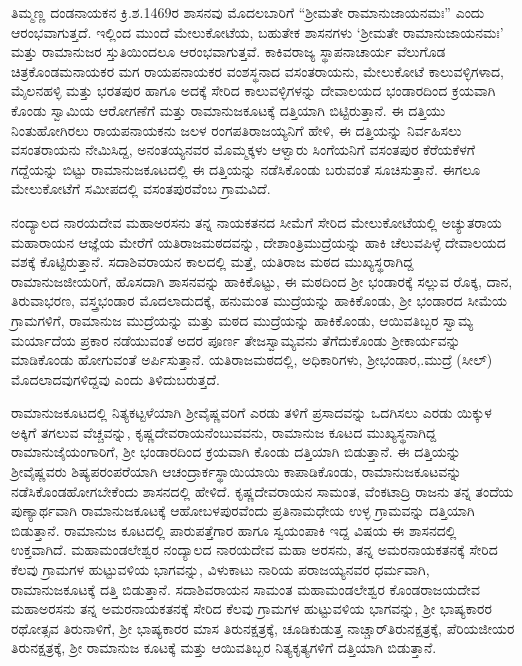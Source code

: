 ತಿಮ್ಮಣ್ಣ ದಂಡನಾಯಕನ ಕ್ರಿ.ಶ.1469ರ ಶಾಸನವು ಮೊದಲಬಾರಿಗೆ “ಶ‍್ರೀಮತೇ ರಾಮಾನುಜಾಯನಮಃ” ಎಂದು ಆರಂಭವಾಗುತ್ತದೆ. ಇಲ್ಲಿಂದ ಮುಂದೆ ಮೇಲುಕೋಟೆಯ, ಬಹುತೇಕ ಶಾಸನಗಳು ‘ಶ‍್ರೀಮತೇ ರಾಮಾನುಜಾಯನಮಃ’ ಮತ್ತು ರಾಮಾನುಜರ ಸ್ತುತಿಯಿಂದಲೂ ಆರಂಭವಾಗುತ್ತವೆ. ಕಾಕಿವರಾಜ್ಯ ಸ್ಥಾಪನಾಚಾರ್ಯ ವೆಲುಗೊಡ ಚಿತ್ರಕೊಂಡಮನಾಯಕರ ಮಗ ರಾಯಪನಾಯಕರ ವಂಶಸ್ಥನಾದ ವಸಂತರಾಯನು, ಮೇಲುಕೋಟೆ ಕಾಲುವಳ್ಳಿಗಳಾದ, ಮೈಲನಹಳ್ಳಿ ಮತ್ತು ಭರತಪುರ ಹಾಗೂ ಅದಕ್ಕೆ ಸೇರಿದ ಕಾಲುವಳ್ಳಿಗಳನ್ನು ದೇವಾಲಯದ ಭಂಡಾರದಿಂದ ಕ್ರಯವಾಗಿ ಕೊಂಡು ಸ್ವಾಮಿಯ ಆರೋಗಣೆಗೆ ಮತ್ತು ರಾಮಾನುಜಕೂಟಕ್ಕೆ ದತ್ತಿಯಾಗಿ ಬಿಟ್ಟಿರುತ್ತಾನೆ. ಈ ದತ್ತಿಯು ನಿಂತುಹೋಗಿರಲು ರಾಯಪನಾಯಕನು ಜಲಳ ರಂಗಪತಿರಾಜಯ್ಯನಿಗೆ ಹೇಳಿ, ಈ ದತ್ತಿಯನ್ನು ನಿರ್ವಹಿಸಲು ವಸಂತರಾಯನು ನೇಮಿಸಿದ್ದ, ಅನಂತಯ್ಯನವರ ಮೊಮ್ಮಕ್ಕಳು ಆಳ್ವಾರು ಸಿಂಗೆಯನಿಗೆ ವಸಂತಪುರ ಕೆರೆಯಕೆಳಗೆ ಗದ್ದೆಯನ್ನು ಬಿಟ್ಟು ರಾಮಾನುಜಕೂಟದಲ್ಲಿ ಈ ದತ್ತಿಯನ್ನು ನಡೆಸಿಕೊಂಡು ಬರುವಂತೆ ಸೂಚಿಸುತ್ತಾನೆ. ಈಗಲೂ ಮೇಲುಕೋಟೆಗೆ ಸಮೀಪದಲ್ಲಿ ವಸಂತಪುರವೆಂಬ ಗ್ರಾಮವಿದೆ.

ನಂದ್ಯಾಲದ ನಾರಯದೇವ ಮಹಾಅರಸನು ತನ್ನ ನಾಯಕತನದ ಸೀಮೆಗೆ ಸೇರಿದ ಮೇಲುಕೋಟೆಯಲ್ಲಿ ಅಚ್ಯುತರಾಯ ಮಹಾರಾಯನ ಆಜ್ಞೆಯ ಮೇರೆಗೆ ಯತಿರಾಜಮಠದವನ್ನು, ದೇಶಾಂತ್ರಿಮುದ್ರೆಯನ್ನು ಹಾಕಿ ಚೆಲುವಪಿಳ್ಳೆ ದೇವಾಲಯದ ವಶಕ್ಕೆ ಕೊಟ್ಟಿರುತ್ತಾನೆ. ಸದಾಶಿವರಾಯನ ಕಾಲದಲ್ಲಿ ಮತ್ತೆ, ಯತಿರಾಜ ಮಠದ ಮುಖ್ಯಸ್ಥರಾಗಿದ್ದ ರಾಮಾನುಜಜೀಯರಿಗೆ, ಹೊಸದಾಗಿ ಶಾಸನವನ್ನು ಹಾಕಿಕೊಟ್ಟು, ಈ ಮಠದಿಂದ ಶ‍್ರೀ ಭಂಡಾರಕ್ಕೆ ಸಲ್ಲುವ ರೊಕ್ಕ, ದಾನ, ತಿರುವಾಭರಣ, ವಸ್ತ್ರಭಂಡಾರ ಮೊದಲಾದುದಕ್ಕೆ, ಹನುಮಂತ ಮುದ್ರೆಯನ್ನು ಹಾಕಿಕೊಂಡು, ಶ‍್ರೀ ಭಂಡಾರದ ಸೀಮೆಯ ಗ್ರಾಮಗಳಿಗೆ, ರಾಮಾನುಜ ಮುದ್ರೆಯನ್ನು ಮತ್ತು ಮಠದ ಮುದ್ರೆಯನ್ನು ಹಾಕಿಕೊಂಡು, ಆಯಿವತಿಬ್ಬರ ಸ್ವಾಮ್ಯ ಮರ್ಯಾದೆಯ ಪ್ರಕಾರ ನಡೆಯುವಂತೆ ಅದರ ಪೂರ್ಣ ತೇಜಸ್ವಾಮ್ಯವನು ತೆಗೆದುಕೊಂಡು ಶ‍್ರೀಕಾರ್ಯವನ್ನು ಮಾಡಿಕೊಂಡು ಹೋಗುವಂತೆ ಅರ್ಪಿಸುತ್ತಾನೆ. ಯತಿರಾಜಮಠದಲ್ಲಿ, ಅಧಿಕಾರಿಗಳು, ಶ‍್ರೀಭಂಡಾರ,.ಮುದ್ರೆ (ಸೀಲ್​) ಮೊದಲಾದವುಗಳಿದ್ದವು ಎಂದು ತಿಳಿದುಬರುತ್ತದೆ.

ರಾಮಾನುಜಕೂಟದಲ್ಲಿ ನಿತ್ಯಕಟ್ಟಳೆಯಾಗಿ ಶ‍್ರೀವೈಷ್ಣವರಿಗೆ ಎರಡು ತಳಿಗೆ ಪ್ರಸಾದವನ್ನು ಒದಗಿಸಲು ಎರಡು ಯಿಕ್ಕುಳ ಅಕ್ಕಿಗೆ ತಗಲುವ ವೆಚ್ಚವನ್ನು, ಕೃಷ್ಣದೇವರಾಯನೆಂಬುವವನು, ರಾಮಾನುಜ ಕೂಟದ ಮುಖ್ಯಸ್ಥನಾಗಿದ್ದ ರಾಮಾನುಜೈಯಂಗಾರಿಗೆ, ಶ‍್ರೀ ಭಂಡಾರದಿಂದ ಕ್ರಯವಾಗಿ ಕೊಂಡು ದತ್ತಿಯಾಗಿ ಬಿಡುತ್ತಾನೆ. ಈ ದತ್ತಿಯನ್ನು ಶ‍್ರೀವೈಷ್ಣವರು ಶಿಷ್ಯಪರಂಪರೆಯಾಗಿ ಆಚಂದ್ರಾರ್ಕಸ್ಥಾಯಿಯಾಯಿ ಕಾಪಾಡಿಕೊಂಡು, ರಾಮಾನುಜಕೂಟವನ್ನು ನಡೆಸಿಕೊಂಡಹೋಗಬೇಕೆಂದು ಶಾಸನದಲ್ಲಿ ಹೇಳಿದೆ. ಕೃಷ್ಣದೇವರಾಯನ ಸಾಮಂತ, ವೆಂಕಟಾದ್ರಿ ರಾಜನು ತನ್ನ ತಂದೆಯ ಪುಣ್ಯಾರ್ಥವಾಗಿ ರಾಮಾನುಜಕೂಟಕ್ಕೆ ಆಹೋಬಳಪುರವೆಂದು ಪ್ರತಿನಾಮಧೇಯ ಉಳ್ಳ ಗ್ರಾಮವನ್ನು ದತ್ತಿಯಾಗಿ ಬಿಡುತ್ತಾನೆ. ರಾಮಾನುಜ ಕೂಟದಲ್ಲಿ ಪಾರುಪತ್ತೆಗಾರ ಹಾಗೂ ಸ್ವಯಂಪಾಕಿ ಇದ್ದ ವಿಷಯ ಈ ಶಾಸನದಲ್ಲಿ ಉಕ್ತವಾಗಿದೆ. ಮಹಾಮಂಡಲೇಶ್ವರ ನಂದ್ಯಾಲದ ನಾರಯದೇವ ಮಹಾ ಅರಸನು, ತನ್ನ ಅಮರನಾಯಕತನಕ್ಕೆ ಸೇರಿದ ಕೆಲವು ಗ್ರಾಮಗಳ ಹುಟ್ಟುವಳಿಯ ಭಾಗವನ್ನು, ವಿಳುಕಾಟು ನಾರಿಯ ಪರಾಜಯ್ಯನವರ ಧರ್ಮವಾಗಿ, ರಾಮಾನುಜಕೂಟಕ್ಕೆ ದತ್ತಿ ಬಿಡುತ್ತಾನೆ. ಸದಾಶಿವರಾಯನ ಸಾಮಂತ ಮಹಾಮಂಡಲೇಶ್ವರ ಕೊಂಡರಾಜಯದೇವ ಮಹಾಅರಸನು ತನ್ನ ಅಮರನಾಯಕತನಕ್ಕೆ ಸೇರಿದ ಕೆಲವು ಗ್ರಾಮಗಳ ಹುಟ್ಟುವಳಿಯ ಭಾಗವನ್ನು, ಶ‍್ರೀ ಭಾಷ್ಯಕಾರರ ರಥೋತ್ಸವ ತಿರುನಾಳಿಗೆ, ಶ‍್ರೀ ಭಾಷ್ಯಕಾರರ ಮಾಸ ತಿರುನಕ್ಷತ್ರಕ್ಕೆ, ಚೂಡಿಕುಡುತ್ತ ನಾಚ್ಚಾರ್​ ತಿರುನಕ್ಷತ್ರಕ್ಕೆ, ಪೆರಿಯಜೀಯರ ತಿರುನಕ್ಷತ್ರಕ್ಕೆ, ಶ‍್ರೀ ರಾಮಾನುಜ ಕೂಟಕ್ಕೆ ಮತ್ತು ಆಯಿವತಿಬ್ಬರ ನಿತ್ಯಕೃತ್ಯಗಳಿಗೆ ದತ್ತಿಯಾಗಿ ಬಿಡುತ್ತಾನೆ.

